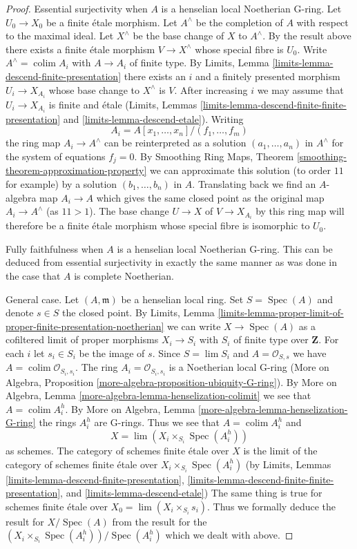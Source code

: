 \documentclass{stacks-project}
\theoremstyle{plain}
\theoremstyle{definition}
\theoremstyle{remark}
\numberwithin{equation}{subsection}
\def\lim{\mathop{\mathrm{lim}}\nolimits}
\def\colim{\mathop{\mathrm{colim}}\nolimits}
\def\Spec{\mathop{\mathrm{Spec}}}
\begin{document}
\begin{proof}
\medskip\noindent
Essential surjectivity when $A$ is a henselian local Noetherian G-ring.
Let $U_0 \to X_0$ be a finite \'etale morphism.
Let $A^\wedge$ be the completion of $A$ with respect to the maximal ideal.
Let $X^\wedge$ be the base change of $X$ to $A^\wedge$.
By the result above there exists a finite \'etale morphism
$V \to X^\wedge$ whose special fibre is $U_0$.
Write $A^\wedge = \colim A_i$ with $A \to A_i$ of finite type.
By Limits, Lemma \ref{limits-lemma-descend-finite-presentation}
there exists an $i$ and a finitely presented morphism $U_i \to X_{A_i}$
whose base change to $X^\wedge$ is $V$. After increasing $i$
we may assume that $U_i \to X_{A_i}$ is finite and \'etale
(Limits, Lemmas \ref{limits-lemma-descend-finite-finite-presentation} and
\ref{limits-lemma-descend-etale}). Writing
$$
A_i = A[x_1, \ldots, x_n]/(f_1, \ldots, f_m)
$$
the ring map $A_i \to A^\wedge$ can be reinterpreted as a solution
$(a_1, \ldots, a_n)$ in $A^\wedge$ for the system of equations $f_j = 0$.
By Smoothing Ring Maps, Theorem \ref{smoothing-theorem-approximation-property}
we can approximate this solution (to order $11$ for example) by a solution
$(b_1, \ldots, b_n)$ in $A$. Translating back we find an $A$-algebra map
$A_i \to A$ which gives the same closed point as the original map
$A_i \to A^\wedge$ (as $11 > 1$). The base change $U \to X$ of $V \to X_{A_i}$
by this ring map will therefore be a finite \'etale morphism whose
special fibre is isomorphic to $U_0$.

\medskip\noindent
Fully faithfulness when $A$ is a henselian local Noetherian G-ring.
This can be deduced from essential surjectivity in exactly the same
manner as was done in the case that $A$ is complete Noetherian.

\medskip\noindent
General case. Let $(A, \mathfrak m)$ be a henselian local ring.
Set $S = \Spec(A)$ and denote $s \in S$ the closed point. By Limits, Lemma
\ref{limits-lemma-proper-limit-of-proper-finite-presentation-noetherian}
we can write $X \to \Spec(A)$ as a cofiltered limit of
proper morphisms $X_i \to S_i$ with $S_i$ of finite type over $\mathbf{Z}$.
For each $i$ let $s_i \in S_i$ be the image of $s$.
Since $S = \lim S_i$ and $A = \mathcal{O}_{S, s}$ we have
$A = \colim \mathcal{O}_{S_i, s_i}$. The ring $A_i = \mathcal{O}_{S_i, s_i}$
is a Noetherian local G-ring (More on Algebra, Proposition
\ref{more-algebra-proposition-ubiquity-G-ring}).
By More on Algebra, Lemma \ref{more-algebra-lemma-henselization-colimit}
we see that $A = \colim A_i^h$. By
More on Algebra, Lemma \ref{more-algebra-lemma-henselization-G-ring}
the rings $A_i^h$ are G-rings. Thus we see that $A = \colim A_i^h$ and
$$
X = \lim (X_i \times_{S_i} \Spec(A_i^h))
$$
as schemes. The category of schemes finite \'etale over $X$ is the limit
of the category of schemes finite \'etale over
$X_i \times_{S_i} \Spec(A_i^h)$ (by
Limits, Lemmas
\ref{limits-lemma-descend-finite-presentation},
\ref{limits-lemma-descend-finite-finite-presentation}, and
\ref{limits-lemma-descend-etale})
The same thing is true for schemes finite \'etale over
$X_0 = \lim (X_i \times_{S_i} s_i)$.
Thus we formally deduce the result for $X / \Spec(A)$
from the result for the $(X_i \times_{S_i} \Spec(A_i^h)) / \Spec(A_i^h)$
which we dealt with above.
\end{proof}
\end{document}
